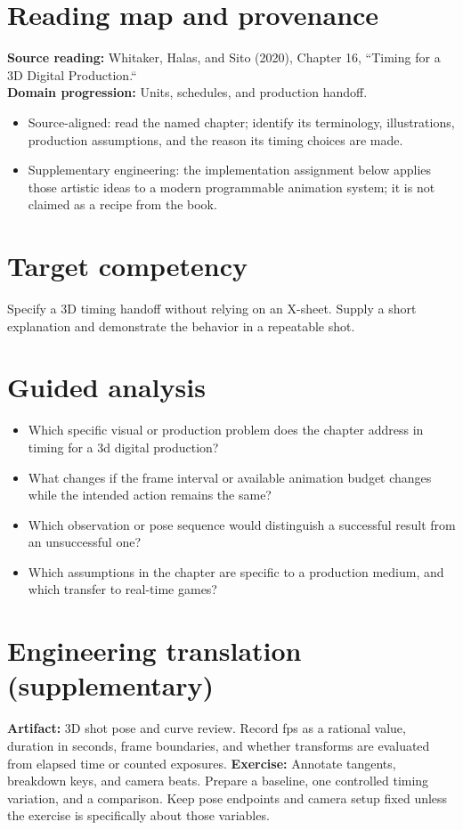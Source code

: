 \documentclass[10pt,letterpaper]{article}
\begin{document}
\makedoctitle
\makedocsummary

\section{Reading map and provenance}
\textbf{Source reading:} Whitaker, Halas, and Sito (2020), Chapter 16, ``Timing for a 3D Digital Production.``\\
\textbf{Domain progression:} Units, schedules, and production handoff.
\begin{itemize}
\item Source-aligned: read the named chapter; identify its terminology, illustrations, production assumptions, and the reason its timing choices are made.
\item Supplementary engineering: the implementation assignment below applies those artistic ideas to a modern programmable animation system; it is not claimed as a recipe from the book.
\end{itemize}
\section{Target competency}
Specify a 3D timing handoff without relying on an X-sheet. Supply a short explanation and demonstrate the behavior in a repeatable shot.
\section{Guided analysis}
\begin{itemize}
\item Which specific visual or production problem does the chapter address in timing for a 3d digital production?
\item What changes if the frame interval or available animation budget changes while the intended action remains the same?
\item Which observation or pose sequence would distinguish a successful result from an unsuccessful one?
\item Which assumptions in the chapter are specific to a production medium, and which transfer to real-time games?
\end{itemize}
\section{Engineering translation (supplementary)}
\textbf{Artifact:} 3D shot pose and curve review. Record fps as a rational value, duration in seconds, frame boundaries, and whether transforms are evaluated from elapsed time or counted exposures.
\textbf{Exercise:} Annotate tangents, breakdown keys, and camera beats. Prepare a baseline, one controlled timing variation, and a comparison. Keep pose endpoints and camera setup fixed unless the exercise is specifically about those variables.
\end{document}
